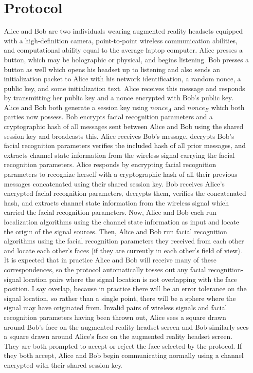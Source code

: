 \documentclass[12pt]{report}
\begin{document}
\section{Protocol}
Alice and Bob are two individuals wearing augmented reality headsets equipped with a high-definition camera, point-to-point wireless communication abilities, and computational ability equal to the average laptop computer. Alice presses a button, which may be holographic or physical, and begins listening. Bob presses a button as well which opens his headset up to listening and also sends an initialization packet to Alice with his network identification, a random nonce, a public key, and some initialization text. Alice receives this message and responds by transmitting her public key and a nonce encrypted with Bob's public key. Alice and Bob both generate a session key using $nonce_A$ and $nonce_B$ which both parties now possess. Bob encrypts facial recognition parameters and a cryptographic hash of all messages sent between Alice and Bob using the shared session key and broadcasts this. Alice receives Bob's message, decrypts Bob's facial recognition parameters verifies the included hash of all prior messages, and extracts channel state information from the wireless signal carrying the facial recognition parameters. Alice responds by encrypting facial recognition parameters to recognize herself with a cryptographic hash of all their previous messages concatenated using their shared session key. Bob receives Alice's encrypted facial recognition parameters, decrypts them, verifies the concatenated hash, and extracts channel state information from the wireless signal which carried the facial recognition parameters. Now, Alice and Bob each run localization algorithms using the channel state information as input and locate the origin of the signal sources. Then, Alice and Bob run facial recognition algorithms using the facial recognition parameters they received from each other and locate each other's faces (if they are currently in each other's field of view). It is expected that in practice Alice and Bob will receive many of these correspondences, so the protocol automatically tosses out any facial recognition-signal location pairs where the signal location is not overlapping with the face position. I say overlap, because in practice there will be an error tolerance on the signal location, so rather than a single point, there will be a sphere where the signal may have originated from. Invalid pairs of wireless signals and facial recognition parameters having been thrown out, Alice sees a square drawn around Bob's face on the augmented reality headset screen and Bob similarly sees a square drawn around Alice's face on the augmented reality headset screen. They are both prompted to accept or reject the face selected by the protocol. If they both accept, Alice and Bob begin communicating normally using a channel encrypted with their shared session key. \\
\end{document}
